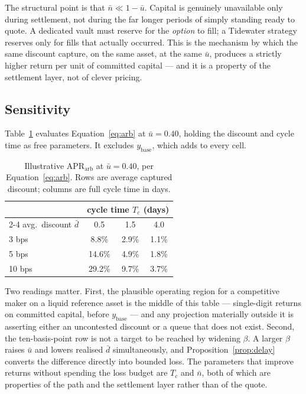 \documentclass[10pt,twocolumn]{article}
\theoremstyle{definition}
\begin{document}
The structural point is that $\bar{n} \ll 1 - \bar{u}$. Capital is genuinely unavailable only during settlement,
not during the far longer periods of simply standing ready to quote. A dedicated vault must reserve for the
\emph{option} to fill; a Tidewater strategy reserves only for fills that actually occurred. This is the mechanism
by which the same discount capture, on the same asset, at the same $\bar u$, produces a strictly higher return per
unit of committed capital --- and it is a property of the settlement layer, not of clever pricing.

\subsection{Sensitivity}

Table~\ref{tab:sens} evaluates Equation~\eqref{eq:arb} at $\bar{u} = 0.40$, holding the discount and cycle time as
free parameters. It excludes $y_{\mathrm{base}}$, which adds to every cell.

\begin{table}[h]
\centering\small
\caption{Illustrative $\mathrm{APR}_{\mathrm{arb}}$ at $\bar{u}=0.40$, per Equation~\eqref{eq:arb}. Rows are
average captured discount; columns are full cycle time in days.}
\label{tab:sens}
\begin{tabular}{@{}lccc@{}}
\toprule
& \multicolumn{3}{c}{cycle time $T_c$ (days)} \\
\cmidrule(l){2-4}
avg.\ discount $\bar{d}$ & 0.5 & 1.5 & 4.0 \\
\midrule
3 bps  & 8.8\%  & 2.9\% & 1.1\% \\
5 bps  & 14.6\% & 4.9\% & 1.8\% \\
10 bps & 29.2\% & 9.7\% & 3.7\% \\
\bottomrule
\end{tabular}
\end{table}

Two readings matter. First, the plausible operating region for a competitive maker on a liquid reference asset is
the middle of this table --- single-digit returns on committed capital, before $y_{\mathrm{base}}$ --- and any
projection materially outside it is asserting either an uncontested discount or a queue that does not exist.
Second, the ten-basis-point row is not a target to be reached by widening $\beta$. A larger $\beta$ raises
$\bar{u}$ and lowers realised $\bar{d}$ simultaneously, and Proposition~\ref{prop:delay} converts the difference
directly into bounded loss. The parameters that improve returns without spending the loss budget are $T_c$ and
$\bar{n}$, both of which are properties of the path and the settlement layer rather than of the quote.
\end{document}
